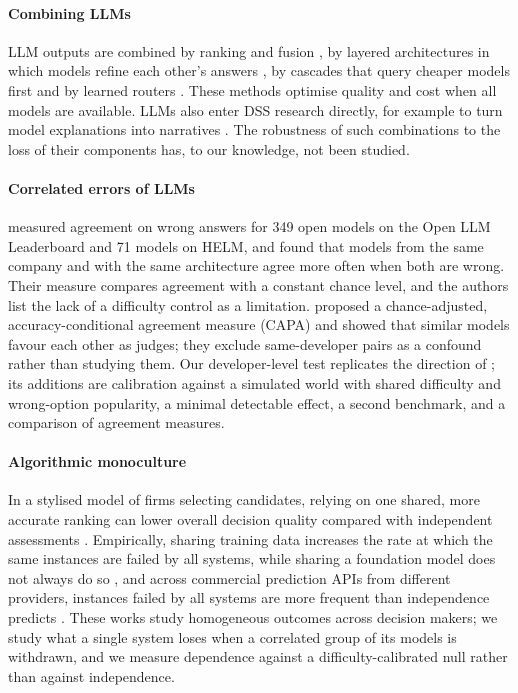 \documentclass[preprint,12pt,authoryear]{elsarticle}
\begin{document}
\paragraph{Combining LLMs} LLM outputs are combined by ranking and fusion \citep{jiang2023blender}, by layered architectures in which models refine each other's answers \citep{wang2025moa}, by cascades that query cheaper models first \citep{chen2024frugalgpt} and by learned routers \citep{ong2025routellm}. These methods optimise quality and cost when all models are available. LLMs also enter DSS research directly, for example to turn model explanations into narratives \citep{martens2025}. The robustness of such combinations to the loss of their components has, to our knowledge, not been studied.

\paragraph{Correlated errors of LLMs} \citet{kim2025correlated} measured agreement on wrong answers for 349 open models on the Open LLM Leaderboard and 71 models on HELM, and found that models from the same company and with the same architecture agree more often when both are wrong. Their measure compares agreement with a constant chance level, and the authors list the lack of a difficulty control as a limitation. \citet{goel2025great} proposed a chance-adjusted, accuracy-conditional agreement measure (CAPA) and showed that similar models favour each other as judges; they exclude same-developer pairs as a confound rather than studying them. Our developer-level test replicates the direction of \citet{kim2025correlated}; its additions are calibration against a simulated world with shared difficulty and wrong-option popularity, a minimal detectable effect, a second benchmark, and a comparison of agreement measures.

\paragraph{Algorithmic monoculture} In a stylised model of firms selecting candidates, relying on one shared, more accurate ranking can lower overall decision quality compared with independent assessments \citep{kleinberg2021monoculture}. Empirically, sharing training data increases the rate at which the same instances are failed by all systems, while sharing a foundation model does not always do so \citep{bommasani2022picking}, and across commercial prediction APIs from different providers, instances failed by all systems are more frequent than independence predicts \citep{toups2023ecosystem}. These works study homogeneous outcomes across decision makers; we study what a single system loses when a correlated group of its models is withdrawn, and we measure dependence against a difficulty-calibrated null rather than against independence.
\end{document}
